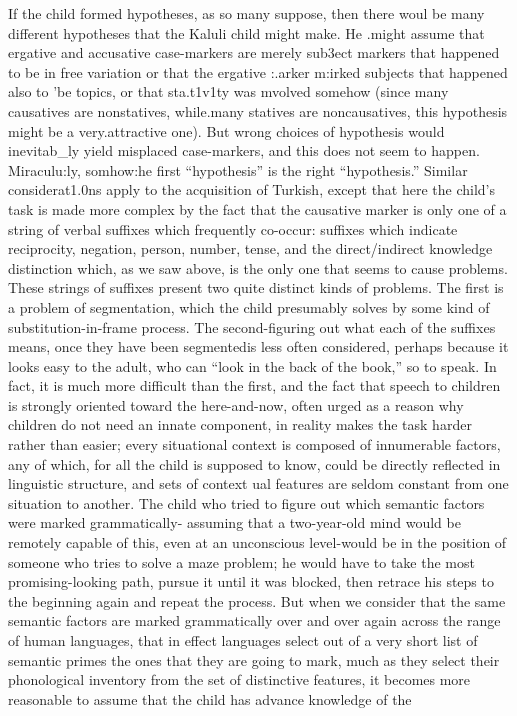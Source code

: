 If the child formed hypotheses, as so many suppose, then there woul be many different hypotheses that the Kaluli child might make. He .might assume that ergative and accusative case-markers are merely sub3ect markers that happened to be in free variation or that the ergative :{\textquotedbl}.arker m:irked subjects that happened also to 'be topics, or that sta.t1v1ty was mvolved somehow (since many causatives are non\-statives, while.many statives are noncausatives, this hypothesis might be a very.attractive one). But wrong choices of hypothesis would inevit\-ab\_ly yield misplaced case-markers, and this does not seem to happen. Miraculu:ly, somhow:he first ``hypothesis'' is the right ``hypothesis.'' Similar considerat1.0ns apply to the acquisition of Turkish, except
that here the child's task is made more complex by the fact that the causative marker is only one of a string of verbal suffixes which fre\-quently co-occur: suffixes which indicate reciprocity, negation, person, number, tense, and the direct/indirect knowledge distinction which, as we saw above, is the only one that seems to cause problems. These strings of suffixes present two quite distinct kinds of problems. The first is a problem of segmentation, which the child presumably solves by some kind of substitution-in-frame process. The second-figuring out what each of the suffixes means, once they have been segmented\-is less often considered, perhaps because it looks easy to the adult, who can ``look in the back of the book,'' so to speak. In fact, it is much more difficult than the first, and the fact that speech to children is strongly oriented toward the here-and-now, often urged as a reason why children do not need an innate component, in reality makes the task harder rather than easier; every situational context is composed of innumerable factors, any of which, for all the child is supposed to know, could be directly reflected in linguistic structure, and sets of context ual features are seldom constant from one situation to another. The child who tried to figure out which semantic factors were marked grammatically- assuming that a two-year-old mind would be remotely capable of this, even at an unconscious level-would be in the position of someone who tries to solve a maze problem; he would have to take the most promising-looking path, pursue it until it was blocked, then retrace his steps to the beginning again and repeat the process. But when we consider that the same semantic factors are marked gram\-matically over and over again across the range of human languages, that in effect languages select out of a very short list of semantic primes the ones that they are going to mark, much as they select their phonological inventory from the set of distinctive features, it becomes more reasonable to assume that the child has advance knowledge of the
